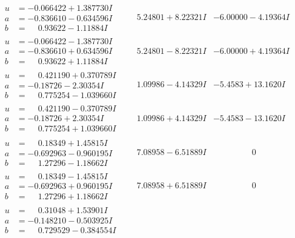 \documentclass[1p]{elsarticle_modified}
\theoremstyle{definition}
\begin{document}
$$\begin{array}{c|c|c}
\begin{aligned}
u &= -0.066422 + 1.387730 I \\
a &= -0.836610 - 0.634596 I \\
b &= \phantom{-}0.93622 - 1.11884 I\end{aligned}
 & \phantom{-}5.24801 + 8.22321 I & -6.00000 - 4.19364 I \\ \hline\begin{aligned}
u &= -0.066422 - 1.387730 I \\
a &= -0.836610 + 0.634596 I \\
b &= \phantom{-}0.93622 + 1.11884 I\end{aligned}
 & \phantom{-}5.24801 - 8.22321 I & -6.00000 + 4.19364 I \\ \hline\begin{aligned}
u &= \phantom{-}0.421190 + 0.370789 I \\
a &= -0.18726 - 2.30354 I \\
b &= \phantom{-}0.775254 - 1.039660 I\end{aligned}
 & \phantom{-}1.09986 - 4.14329 I & -5.4583 + 13.1620 I \\ \hline\begin{aligned}
u &= \phantom{-}0.421190 - 0.370789 I \\
a &= -0.18726 + 2.30354 I \\
b &= \phantom{-}0.775254 + 1.039660 I\end{aligned}
 & \phantom{-}1.09986 + 4.14329 I & -5.4583 - 13.1620 I \\ \hline\begin{aligned}
u &= \phantom{-}0.18349 + 1.45815 I \\
a &= -0.692963 - 0.960195 I \\
b &= \phantom{-}1.27296 - 1.18662 I\end{aligned}
 & \phantom{-}7.08958 - 6.51889 I & \phantom{-0.000000 } 0 \\ \hline\begin{aligned}
u &= \phantom{-}0.18349 - 1.45815 I \\
a &= -0.692963 + 0.960195 I \\
b &= \phantom{-}1.27296 + 1.18662 I\end{aligned}
 & \phantom{-}7.08958 + 6.51889 I & \phantom{-0.000000 } 0 \\ \hline\begin{aligned}
u &= \phantom{-}0.31048 + 1.53901 I \\
a &= -0.148210 - 0.503925 I \\
b &= \phantom{-}0.729529 - 0.384554 I\end{aligned}

\end{array}$$
\end{document}
